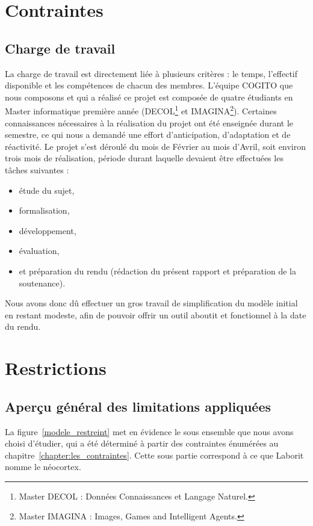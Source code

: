 \section{Contraintes}

\subsection{Charge de travail}
La charge de travail est directement liée à plusieurs critères : le temps,
l'effectif disponible et les compétences de chacun des membres. L'équipe COGITO que nous 
composons et qui a réalisé ce projet est composée de
quatre étudiants en Master informatique première année (DECOL\footnote{Master
DECOL : Données Connaissances et Langage Naturel.} et IMAGINA\footnote{Master
IMAGINA : Images, Games and Intelligent Agents.}). Certaines connaissances 
nécessaires à la réalisation du projet ont été enseignée durant le semestre, ce qui nous a demandé une effort d'anticipation, d'adaptation et de réactivité. Le projet s'est déroulé du mois de Février au mois d'Avril, soit environ trois mois de réalisation, période durant laquelle devaient être effectuées les tâches
suivantes :

\begin{itemize}
\item étude du sujet, 
\item formalisation, 
\item développement, 
\item évaluation,
\item et préparation du rendu (rédaction du présent rapport et préparation de la soutenance).
\end{itemize}

Nous avons donc dû effectuer un gros travail de simplification du modèle initial en restant modeste, afin de pouvoir offrir un outil aboutit et fonctionnel à la date du rendu.

\section{Restrictions}

\subsection{Aperçu général des limitations appliquées}

La figure~\ref{modele_restreint} met en évidence le sous ensemble que nous avons choisi d'étudier, qui a été déterminé à partir des contraintes énumérées au chapitre~\ref{chapter:les_contraintes}. Cette sous partie correspond à ce que Laborit nomme le néocortex.

